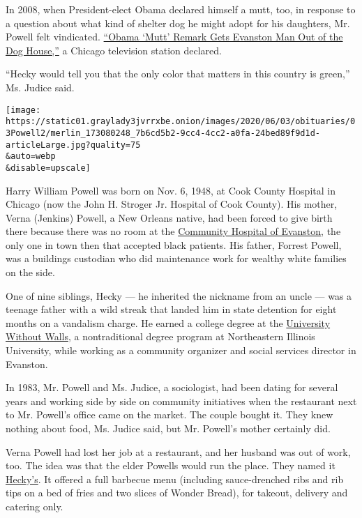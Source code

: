 In 2008, when President-elect Obama declared himself a mutt, too, in
response to a question about what kind of shelter dog he might adopt for
his daughters, Mr. Powell felt vindicated.
\href{https://www.nbcchicago.com/news/local/obama-mutt-remark-gets-evanston-man-out-of-the-dog-house/1845081/}{``Obama
`Mutt' Remark Gets Evanston Man Out of the Dog House,''} a Chicago
television station declared.

``Hecky would tell you that the only color that matters in this country
is green,'' Ms. Judice said.

\texttt{[image: https://static01.graylady3jvrrxbe.onion/images/2020/06/03/obituaries/03Powell2/merlin\_173080248\_7b6cd5b2-9cc4-4cc2-a0fa-24bed89f9d1d-articleLarge.jpg?quality=75\\\&auto=webp\\\&disable=upscale]}

Harry William Powell was born on Nov. 6, 1948, at Cook County Hospital
in Chicago (now the John H. Stroger Jr. Hospital of Cook County). His
mother, Verna (Jenkins) Powell, a New Orleans native, had been forced to
give birth there because there was no room at the
\href{https://dailynorthwestern.com/2000/04/13/archive-manual/exhibit-explores-citys-history-of-segregation/}{Community
Hospital of Evanston}, the only one in town then that accepted black
patients. His father, Forrest Powell, was a buildings custodian who did
maintenance work for wealthy white families on the side.

One of nine siblings, Hecky --- he inherited the nickname from an uncle
--- was a teenage father with a wild streak that landed him in state
detention for eight months on a vandalism charge. He earned a college
degree at the
\href{https://www.neiu.edu/academics/nontraditional-degree-programs/university-without-walls}{University
Without Walls}, a nontraditional degree program at Northeastern Illinois
University, while working as a community organizer and social services
director in Evanston.

In 1983, Mr. Powell and Ms. Judice, a sociologist, had been dating for
several years and working side by side on community initiatives when the
restaurant next to Mr. Powell's office came on the market. The couple
bought it. They knew nothing about food, Ms. Judice said, but Mr.
Powell's mother certainly did.

Verna Powell had lost her job at a restaurant, and her husband was out
of work, too. The idea was that the elder Powells would run the place.
They named it \href{https://www.heckys.com}{Hecky's}. It offered a full
barbecue menu (including sauce-drenched ribs and rib tips on a bed of
fries and two slices of Wonder Bread), for takeout, delivery and
catering only.

